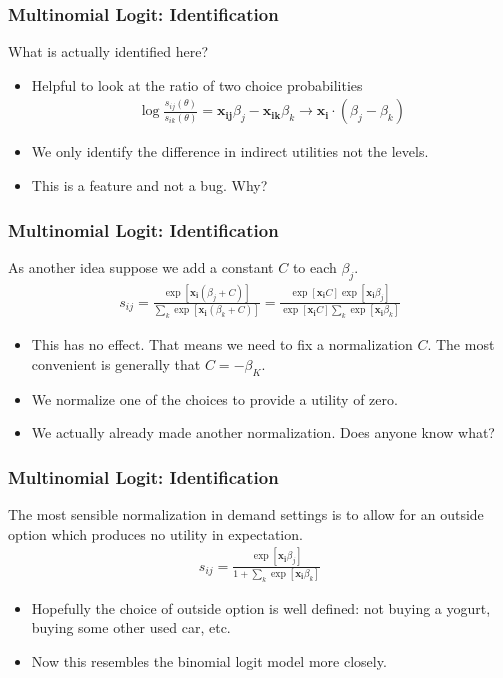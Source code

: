 \documentclass[xcolor=pdftex,dvipsnames,table,mathserif]{beamer}
\begin{document}
\begin{frame}
\frametitle{Multinomial Logit: Identification}
What is actually identified here?
\begin{itemize}
\item Helpful to look at the ratio of two choice probabilities
\begin{eqnarray*}
\log \frac{s_{ij}(\theta)}{s_{ik}(\theta)} = \mathbf{x_{ij}} \beta_j - \mathbf{x_{ik}} \beta_k \rightarrow  \mathbf{x_i}\cdot(\beta_j - \beta_k)
\end{eqnarray*}
\item We only identify the \alert{difference in indirect utilities} not the levels.
\item This is a feature and not a bug. Why?
\end{itemize}
\end{frame}

\begin{frame}
\frametitle{Multinomial Logit: Identification}
As another idea suppose we add a constant $C$ to each $\beta_j$.
\begin{eqnarray*}
s_{ij} = \frac{\exp[\mathbf{x_i} (\beta_j+C) ]}{\sum_k \exp[\mathbf{x_i} (\beta_k+C) ]} =  \frac{\exp[\mathbf{x_i} C] \exp[\mathbf{x_i} \beta_j ]}{\exp[\mathbf{x_i} C] \sum_k \exp[\mathbf{x_i} \beta_k ]} 
\end{eqnarray*}
\begin{itemize}
\item This has no effect.  That means we need to fix a normalization $C$. The most convenient is generally that $C = - \beta_K$. \
\item We normalize one of the choices to provide a utility of zero.
\item We actually already made another normalization. Does anyone know what?
\end{itemize}
\end{frame}


\begin{frame}
\frametitle{Multinomial Logit: Identification}
The most sensible normalization in demand settings is to allow for an \alert{outside option} which produces no utility in expectation.
\begin{eqnarray*}
s_{ij} = \frac{\exp[\mathbf{x_i}\beta_j ]}{1+\sum_k \exp[\mathbf{x_i} \beta_k ]} 
\end{eqnarray*}
\begin{itemize}
\item Hopefully the choice of outside option is well defined: not buying a yogurt, buying some other used car, etc.
\item Now this resembles the binomial logit model more closely.
\end{itemize}
\end{frame}
\end{document}
